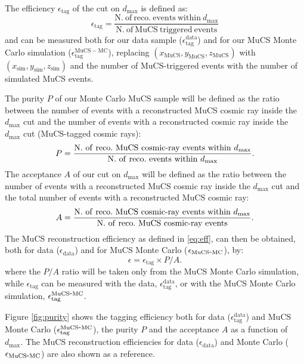 \documentclass[a4paper]{scrartcl}
\def\myhyphen{{\hbox{-}}}
\begin{document}
The efficiency $\epsilon_{\mathrm{tag}}$ of the cut on $d_{\mathrm{max}}$ is defined as:
\begin{equation}
  \epsilon_{\mathrm{tag}}=\frac{\mathrm{N.~of~reco.~events~within~}d_{\mathrm{max}}}{\mathrm{N.~of~MuCS~triggered~events}}
\end{equation}
and can be measured both for our data sample ($\epsilon^{\mathrm{data}}_{\mathrm{tag}}$) and for our MuCS Monte Carlo simulation ($\epsilon^{\mathrm{MuCS-MC}}_{\mathrm{tag}}$), replacing $(x_{\mathrm{MuCS}},y_{\mathrm{MuCS}},z_{\mathrm{MuCS}})$ with $(x_{\mathrm{sim}},y_{\mathrm{sim}},z_{\mathrm{sim}})$ and the number of MuCS-triggered events with the number of simulated MuCS events.

The purity $P$ of our Monte Carlo MuCS sample will be defined as the ratio between the number of events with a reconstructed MuCS cosmic ray inside the $d_{\mathrm{max}}$ cut and the number of events with a reconstructed cosmic ray inside the $d_{\mathrm{max}}$ cut (MuCS-tagged cosmic rays):
\begin{equation}
  P=\frac{\mathrm{N.~of~reco.~MuCS~cosmic\myhyphen ray~events~within~}d_{\mathrm{max}}}{\mathrm{N.~of~reco.~events~within~}d_{\mathrm{max}}}.
\end{equation}
The acceptance $A$ of our cut on $d_{\mathrm{max}}$ will be defined as the ratio between the number of events with a reconstructed MuCS cosmic ray inside the $d_{\mathrm{max}}$ cut and the total number of events with a reconstructed MuCS cosmic ray:
\begin{equation}
  A=\frac{\mathrm{N.~of~reco.~MuCS~cosmic\myhyphen ray~events~within~}d_{\mathrm{max}}}{\mathrm{N.~of~reco.~MuCS~cosmic\myhyphen ray~events}}.
\end{equation}
The MuCS reconstruction efficiency as defined in \eqref{eq:eff}, can then be obtained, both for data ($\epsilon_{\mathrm{data}}$) and for MuCS Monte Carlo ($\epsilon_{\mathrm{MuCS\myhyphen MC}}$), by:
\begin{equation}\label{eq:mceff}
  \epsilon = \epsilon_{\mathrm{tag}} \times P / A.
\end{equation}
where the $P/A$ ratio will be taken only from the MuCS Monte Carlo simulation, while $\epsilon_{\mathrm{tag}}$ can be measured with the data, $\epsilon^{\mathrm{data}}_{\mathrm{tag}}$, or with the MuCS Monte Carlo simulation, $\epsilon^{\mathrm{MuCS\myhyphen MC}}_{\mathrm{tag}}$.

Figure \ref{fig:purity} shows the tagging efficiency both for data ($\epsilon^{\mathrm{data}}_{\mathrm{tag}}$) and MuCS Monte Carlo  ($\epsilon^{\mathrm{MuCS\myhyphen MC}}_{\mathrm{tag}}$), the purity $P$ and the acceptance $A$ as a function of $d_{\mathrm{max}}$. The MuCS reconstruction efficiencies for data ($\epsilon_{\mathrm{data}}$) and Monte Carlo ($\epsilon_{\mathrm{MuCS\myhyphen MC}}$) are also shown as a reference.
\end{document}
